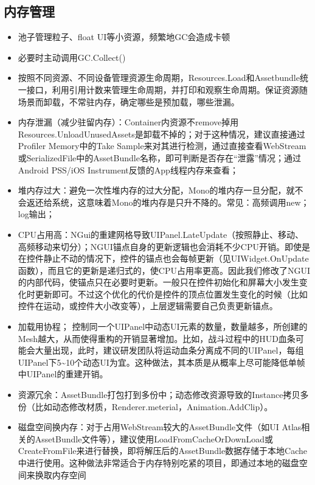 \documentclass[9pt, b5paper]{article}
\begin{document}
\subsection{内存管理}
\label{sec-5-3}
\begin{itemize}
\item 池子管理粒子、float UI等小资源，频繁地GC会造成卡顿
\item 必要时主动调用GC.Collect()
\item 按照不同资源、不同设备管理资源生命周期，Resources.Load和Assetbundle统一接口，利用引用计数来管理生命周期，并打印和观察生命周期。保证资源随场景而卸载，不常驻内存，确定哪些是预加载，哪些泄漏。
\item 内存泄漏（减少驻留内存）：Container内资源不remove掉用Resources.UnloadUnusedAssets是卸载不掉的；对于这种情况，建议直接通过Profiler Memory中的Take Sample来对其进行检测，通过直接查看WebStream或SerializedFile中的AssetBundle名称，即可判断是否存在“泄露”情况；通过Android PSS/iOS Instrument反馈的App线程内存来查看；
\item 堆内存过大：避免一次性堆内存的过大分配，Mono的堆内存一旦分配，就不会返还给系统，这意味着Mono的堆内存是只升不降的。常见：高频调用new；log输出；
\item CPU占用高：NGui的重建网格导致UIPanel.LateUpdate（按照静止、移动、高频移动来切分）；NGUI锚点自身的更新逻辑也会消耗不少CPU开销。即使是在控件静止不动的情况下，控件的锚点也会每帧更新（见UIWidget.OnUpdate函数），而且它的更新是递归式的，使CPU占用率更高。因此我们修改了NGUI的内部代码，使锚点只在必要时更新。一般只在控件初始化和屏幕大小发生变化时更新即可。不过这个优化的代价是控件的顶点位置发生变化的时候（比如控件在运动，或控件大小改变等），上层逻辑需要自己负责更新锚点。
\item 加载用协程； 控制同一个UIPanel中动态UI元素的数量，数量越多，所创建的Mesh越大，从而使得重构的开销显著增加。比如，战斗过程中的HUD血条可能会大量出现，此时，建议研发团队将运动血条分离成不同的UIPanel，每组UIPanel下5\textasciitilde{}10个动态UI为宜。这种做法，其本质是从概率上尽可能降低单帧中UIPanel的重建开销。
\item 资源冗余：AssetBundle打包打到多份中；动态修改资源导致的Instance拷贝多份（比如动态修改材质，Renderer.meterial，Animation.AddClip）。
\item 磁盘空间换内存：对于占用WebStream较大的AssetBundle文件（如UI Atlas相关的AssetBundle文件等），建议使用LoadFromCacheOrDownLoad或CreateFromFile来进行替换，即将解压后的AssetBundle数据存储于本地Cache中进行使用。这种做法非常适合于内存特别吃紧的项目，即通过本地的磁盘空间来换取内存空间
\end{itemize}
\end{document}
